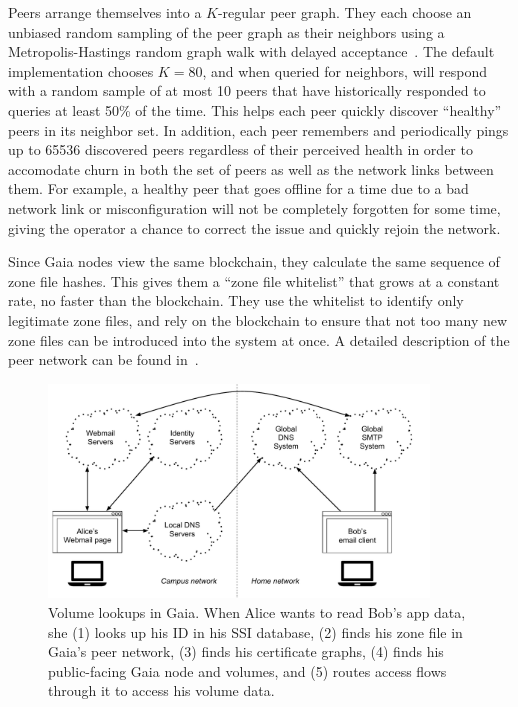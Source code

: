 Peers arrange themselves into a $K$-regular peer graph.  They each choose an
unbiased random sampling of the peer graph as their neighbors using a
Metropolis-Hastings random graph walk with delayed acceptance~\cite{lee-xu-eun}.
The default implementation chooses $K=80$, and when queried for neighbors, will
respond with a random sample of at most 10 peers that
have historically responded to queries at least 50\% of the time.  This helps
each peer quickly discover ``healthy'' peers in its neighbor set.  In addition,
each peer remembers and periodically pings up to 65536 discovered
peers regardless of their perceived health in order to accomodate churn in both
the set of peers as well as the network links between them.  For example, a
healthy peer that goes offline for a time due to a bad network link or
misconfiguration will not be completely forgotten for some time, giving the
operator a chance to correct the issue and quickly rejoin the network.

Since Gaia nodes view the same blockchain, they calculate the same sequence of zone
file hashes.  This gives them a ``zone file whitelist'' that grows at a constant
rate, no faster than the blockchain.  They use the whitelist to identify only
legitimate zone files, and rely on the blockchain to ensure that not too many
new zone files can be introduced into the system at once.  A detailed
description of the peer network can be found in~\cite{ali2017}.

\begin{figure}[h]
   \centering
   \includegraphics[width=0.9\textwidth,page=18]{figures/dissertation-figures}
   \caption{Volume lookups in Gaia.  When Alice wants to read Bob's app data, she
   (1) looks up his ID in his SSI database, (2) finds his zone file in
   Gaia's peer network, (3) finds his certificate graphs, (4) finds his
   public-facing Gaia node and volumes, and (5) routes access flows through it
   to access his volume data.}
   \label{fig:chap3-gaia-volume-lookups}
\end{figure}

